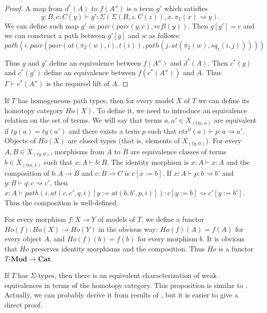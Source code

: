 \documentclass{mscs}
\newcommand{\repl}{:=}
\newcommand{\idtype}{\rightsquigarrow}
\newcommand{\cat}[1]{\mathbf{#1}}
\newcommand{\Mod}[1]{#1\text{-}\cat{Mod}}
\numberwithin{figure}{section}
\begin{document}
\begin{proof}
A map from $d^*(A)$ to $f(A'')$ is a term $g'$ which satisfies
\[ y : B, c : C(y) \vdash g' : \Sigma(\Sigma(B, z.\,C(z)), x.\,\pi_1(x) \idtype y). \]
We can define such map $g'$ as $pair(pair(y,c),refl(y))$.
Then $g[g'] = c$ and we can construct a path between $g'[g]$ and $w$ as follows:
\[ path(i.\,pair(pair(at(\pi_2(w),i), t(i)), path(j.\,at(\pi_2(w),sq_r(i,j))))) \]

Thus $g$ and $g'$ define an equivalence between $f(A'')$ and $d^*(A)$.
Then $c^*(g)$ and $c^*(g')$ define an equivalence between $f(c^*(A''))$ and $A$.
Thus $\Gamma \vdash c^*(A'')$ is the required lift of $A$.
\end{proof}

If $T$ has homogeneous path types, then for every model $X$ of $T$ we can define its homotopy category $Ho(X)$.
To define it, we need to introduce an equivalence relation on the set of terms.
We will say that terms $a,a' \in X_{(tm,n)}$ are equivalent if $ty(a) = ty(a')$ and there exists a term $p$ such that $ctx^0(a) \vdash p : a \idtype a'$.
Objects of $Ho(X)$ are closed types (that is, elements of $X_{(ty,0)}$).
For every $A,B \in X_{(ty,0)}$, morphisms from $A$ to $B$ are equivalence classes of terms $b \in X_{(tm,1)}$ such that $x : A \vdash b : B$.
The identity morphism is $x : A \vdash x : A$ and the composition of $b : A \to B$ and $c : B \to C$ is $c[x \repl b]$.
If $x : A \vdash p : b \idtype b'$ and $y : B \vdash q : c \idtype c'$, then $x : A \vdash path(i.\,at(c,c',q,i)[y \repl at(b,b',p,i)]) : c[y \repl b] \idtype c'[y \repl b']$.
Thus the composition is well-defined.

For every morphism $f : X \to Y$ of models of $T$, we define a functor $Ho(f) : Ho(X) \to Ho(Y)$ in the obvious way:
$Ho(f)(A) = f(A)$ for every object $A$, and $Ho(f)(b) = f(b)$ for every morphism $b$.
It is obvious that $Ho$ preserves identity morphisms and the composition.
Thus $Ho$ is a functor $\Mod{T} \to \cat{Cat}$.

If $T$ has $\Sigma$-types, then there is an equivalent characterization of weak equivalences in terms of the homotopy category.
This proposition is similar to \cite[Th\'eor\`eme 3.25]{cis10b}.
Actually, we can probably derive it from results of \cite{cis10b}, but it is easier to give a direct proof.
\end{document}
